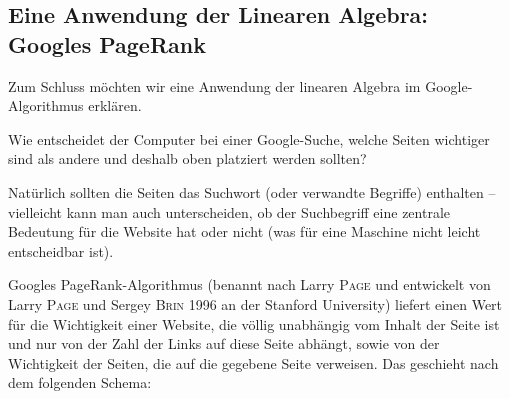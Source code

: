 \subsection{Eine Anwendung der Linearen Algebra: Googles PageRank}
\label{sec:2.13}
Zum Schluss möchten wir eine Anwendung der linearen Algebra im Google-Algorithmus  erklären.

Wie entscheidet der Computer bei einer Google-Suche, welche Seiten wichtiger sind als andere und deshalb oben platziert werden sollten?

Natürlich sollten die Seiten das Suchwort (oder verwandte Begriffe) enthalten -- vielleicht kann man auch unterscheiden, ob der Suchbegriff eine zentrale Bedeutung für die Website hat oder nicht (was für eine Maschine nicht leicht entscheidbar ist).

Googles PageRank-Algorithmus (benannt nach Larry \textsc{Page} und entwickelt von Larry \textsc{Page} und Sergey \textsc{Brin} 1996 an der Stanford University) liefert einen Wert für die Wichtigkeit einer Website, die völlig unabhängig vom Inhalt der Seite ist und nur von der Zahl der Links auf diese Seite abhängt, sowie von der Wichtigkeit der Seiten, die auf die gegebene Seite verweisen.
Das geschieht nach dem folgenden Schema:

